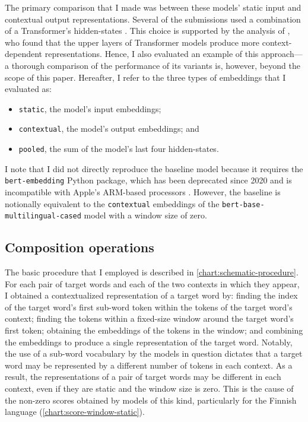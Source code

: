 The primary comparison that I made was between these models' static input and
contextual output representations.
Several of the submissions used a combination of a Transformer's hidden-states
\parencites[e.g.][276]{Gamallo2020}[61]{CostellaPessutto2020}[145]{Hettiarachchi2020}.
This choice is supported by the analysis of \textcite{Ethayarajh2019}, who found that
the upper layers of Transformer models produce more context-dependent representations.
Hence, I also evaluated an example of this approach—a thorough comparison of the
performance of its variants is, however, beyond the scope of this paper.
Hereafter, I refer to the three types of embeddings that I evaluated as:
\begin{itemize}
  \item \texttt{static}, the model's input embeddings;
  \item \texttt{contextual}, the model's output embeddings; and
  \item \texttt{pooled}, the sum of the model's last four hidden-states.
\end{itemize}

I note that I did not directly reproduce the baseline model because it requires the
\texttt{bert-embedding} Python package, which has been deprecated since 2020 and is
incompatible with Apple's ARM-based processors \parencite{Lai2023}.
However, the baseline is notionally equivalent to the \texttt{contextual} embeddings of
the \texttt{bert-base-multilingual-cased} model with a window size of zero.

\subsection{Composition operations}

The basic procedure that I employed is described in \cref{chart:schematic-procedure}.
For each pair of target words and each of the two contexts in which they appear, I
obtained a contextualized representation of a target word by: finding the index of the
target word's first sub-word token within the tokens of the target word's context;
finding the tokens within a fixed-size window around the target word's first token;
obtaining the embeddings of the tokens in the window; and combining the embeddings to
produce a single representation of the target word.
Notably, the use of a sub-word vocabulary by the models in question
\parencite[e.g.,][4174]{Devlin2019} dictates that a target word may be represented by a
different number of tokens in each context.
As a result, the representations of a pair of target words may be different in each
context, even if they are static and the window size is zero.
This is the cause of the non-zero scores obtained by models of this kind, particularly
for the Finnish language (\cref{chart:score-window-static}).

